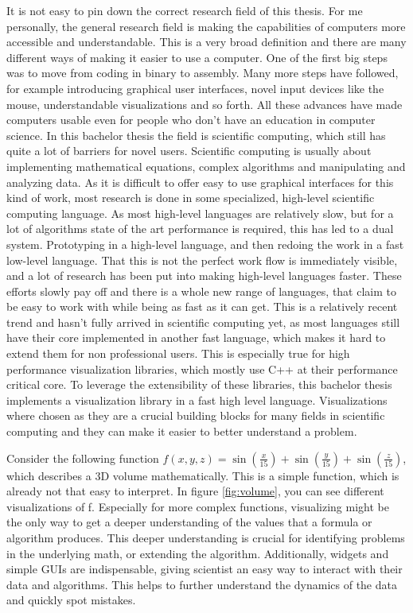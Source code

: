 It is not easy to pin down the correct research field of this thesis.
For me personally, the general research field is making the capabilities of computers more accessible and understandable.
This is a very broad definition and there are many different ways of making it easier to use a computer. 
One of the first big steps was to move from coding in binary to assembly. 
Many more steps have followed, for example introducing graphical user interfaces, novel input devices like the mouse, understandable visualizations and so forth.
All these advances have made computers usable even for people who don't have an education in computer science.
In this bachelor thesis the field is scientific computing, which still has quite a lot of barriers for novel users.
Scientific computing is usually about implementing mathematical equations, complex algorithms and manipulating and analyzing data.
As it is difficult to offer easy to use graphical interfaces for this kind of work, most research is done in some specialized, high-level scientific computing language. As most high-level languages are relatively slow, but for a lot of algorithms state of the art performance is required, this has led to a dual system. Prototyping in a high-level language, and then redoing the work in a fast low-level language.
That this is not the perfect work flow is immediately visible, and a lot of research has been put into making high-level languages faster.
These efforts slowly pay off and there is a whole new range of languages, that claim to be easy to work with while being as fast as it can get.
This is a relatively recent trend and hasn't fully arrived in scientific computing yet, as most languages still have their core implemented in another fast language, which makes it hard to extend them for non professional users.
This is especially true for high performance visualization libraries, which mostly use C++ at their performance critical core.
To leverage the extensibility of these libraries, this bachelor thesis implements a visualization library in a fast high level language.
Visualizations where chosen as they are a crucial building blocks for many fields in scientific computing and they can make it easier to better understand a problem. 

Consider the following function $f(x,y,z)=\sin(\frac{x}{15})+\sin(\frac{y}{15})+\sin(\frac{z}{15})$, which describes a 3D volume mathematically. 
This is a simple function, which is already not that easy to interpret. In figure \ref{fig:volume}, you can see different visualizations of f. 
Especially for more complex functions, visualizing might be the only way to get a deeper understanding of the values that a formula or algorithm produces.
This deeper understanding is crucial for identifying problems in the underlying math, or extending the algorithm.
Additionally, widgets and simple \ac{GUI}s are indispensable, giving scientist an easy way to interact with their data and algorithms.
This helps to further understand the dynamics of the data and quickly spot mistakes.

